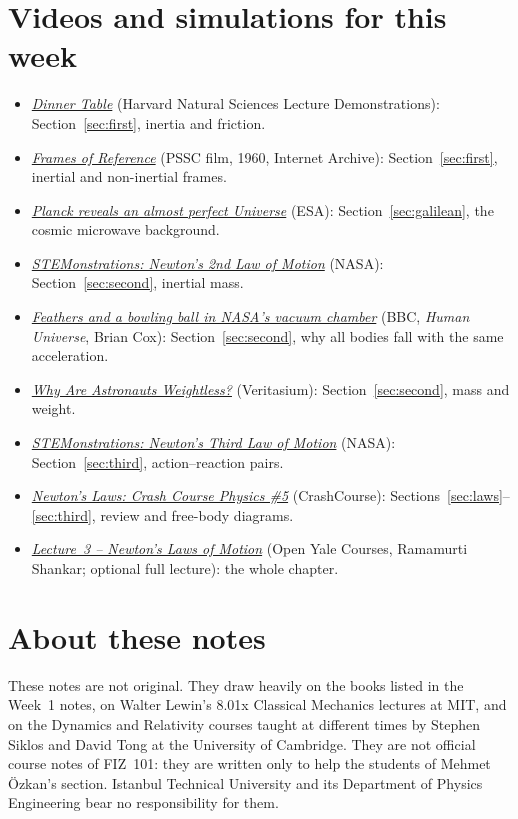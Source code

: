 \documentclass[11pt,a4paper]{article}
\begin{document}
\section*{Videos and simulations for this week}
\begin{itemize}[nosep]
\item \href{https://www.youtube.com/watch?v=1E6Zp5dptQ4}{\emph{Dinner Table}} (Harvard Natural
  Sciences Lecture Demonstrations): Section~\ref{sec:first}, inertia and friction.
\item \href{https://archive.org/details/frames_of_reference}{\emph{Frames of Reference}} (PSSC
  film, 1960, Internet Archive): Section~\ref{sec:first}, inertial and non-inertial frames.
\item \href{https://www.esa.int/esatv/Videos/2013/03/Planck_reveals_an_almost_perfect_Universe}{\emph{Planck
  reveals an almost perfect Universe}} (ESA): Section~\ref{sec:galilean}, the cosmic microwave
  background.
\item \href{https://plus.nasa.gov/video/stemonstrations-newtons-2nd-law-of-motion}{\emph{STEMonstrations:
  Newton's 2nd Law of Motion}} (NASA): Section~\ref{sec:second}, inertial mass.
\item \href{https://www.youtube.com/watch?v=E43-CfukEgs}{\emph{Feathers and a bowling ball in NASA's
  vacuum chamber}} (BBC, \emph{Human Universe}, Brian Cox): Section~\ref{sec:second}, why all
  bodies fall with the same acceleration.
\item \href{https://www.youtube.com/watch?v=iQOHRKKNNLQ}{\emph{Why Are Astronauts Weightless?}}
  (Veritasium): Section~\ref{sec:second}, mass and weight.
\item \href{https://plus.nasa.gov/video/stemonstrations-newtons-third-law-of-motion/}{\emph{STEMonstrations:
  Newton's Third Law of Motion}} (NASA): Section~\ref{sec:third}, action--reaction pairs.
\item \href{https://www.youtube.com/watch?v=kKKM8Y-u7ds}{\emph{Newton's Laws: Crash Course Physics
  \#5}} (CrashCourse): Sections~\ref{sec:laws}--\ref{sec:third}, review and free-body diagrams.
\item \href{https://oyc.yale.edu/node/1553}{\emph{Lecture~3 -- Newton's Laws of Motion}} (Open Yale
  Courses, Ramamurti Shankar; optional full lecture): the whole chapter.
\end{itemize}

\section*{About these notes}
These notes are not original. They draw heavily on the books listed in the Week~1 notes, on Walter Lewin's 8.01x Classical Mechanics lectures at MIT, and on the Dynamics and Relativity courses taught at different times by Stephen Siklos and David Tong at the University of Cambridge. They are not official course notes of FIZ~101: they are written only to help the students of Mehmet \"Ozkan's section. Istanbul Technical University and its Department of Physics Engineering bear no responsibility for them.
\end{document}
